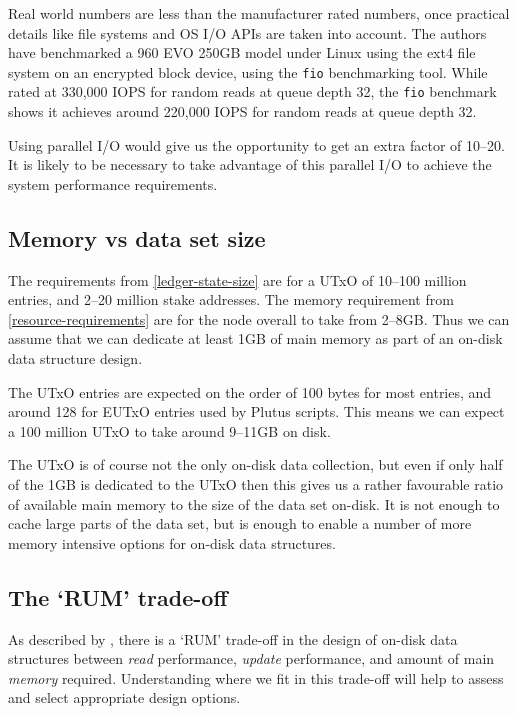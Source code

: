 \documentclass[11pt,a4paper]{article}
\begin{document}
Real world numbers are less than the manufacturer rated numbers, once practical
details like file systems and OS I/O APIs are taken into account. The authors
have benchmarked a 960 EVO 250GB model under Linux using the ext4 file system
on an encrypted block device, using the {\tt fio} benchmarking tool. While
rated at 330,000 IOPS for random reads at queue depth 32, the {\tt fio}
benchmark shows it achieves around 220,000 IOPS for random reads at queue depth
32.

Using parallel I/O would give us the opportunity to get an extra factor of
\texttimes{}10--\texttimes{}20. It is likely to be necessary to take advantage
of this parallel I/O to achieve the system performance requirements.

\subsection{Memory vs data set size}
\label{memory-vs-data-set-size}

The requirements from \cref{ledger-state-size} are for a UTxO of 10--100 million
entries, and 2--20 million stake addresses. The memory requirement from
\cref{resource-requirements} are for the node overall to take from 2--8GB.
Thus we can assume that we can dedicate at least 1GB of main memory as part of
an on-disk data structure design.

The UTxO entries are expected on the order of 100 bytes for most entries, and
around 128 for EUTxO entries used by Plutus scripts. This means we can expect
a 100 million UTxO to take around 9--11GB on disk.

The UTxO is of course not the only on-disk data collection, but even if only
half of the 1GB is dedicated to the UTxO then this gives us a rather favourable
ratio of available main memory to the size of the data set on-disk. It is not
enough to cache large parts of the data set, but is enough to enable a number
of more memory intensive options for on-disk data structures.

\subsection{The `RUM' trade-off}

As described by \cite{rum-conjecture}, there is a `RUM' trade-off in the design
of on-disk data structures between \emph{read} performance, \emph{update}
performance, and amount of main \emph{memory} required. Understanding where we
fit in this trade-off will help to assess and select appropriate design options.
\end{document}
